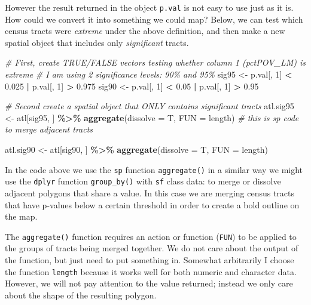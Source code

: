 \documentclass[
]{book}
\newenvironment{Shaded}{\begin{snugshade}}{\end{snugshade}}
\newcommand{\AttributeTok}[1]{\textcolor[rgb]{0.13,0.29,0.53}{#1}}
\newcommand{\CommentTok}[1]{\textcolor[rgb]{0.56,0.35,0.01}{\textit{#1}}}
\newcommand{\DecValTok}[1]{\textcolor[rgb]{0.00,0.00,0.81}{#1}}
\newcommand{\FloatTok}[1]{\textcolor[rgb]{0.00,0.00,0.81}{#1}}
\newcommand{\FunctionTok}[1]{\textcolor[rgb]{0.13,0.29,0.53}{\textbf{#1}}}
\newcommand{\NormalTok}[1]{#1}
\newcommand{\OtherTok}[1]{\textcolor[rgb]{0.56,0.35,0.01}{#1}}
\newcommand{\SpecialCharTok}[1]{\textcolor[rgb]{0.81,0.36,0.00}{\textbf{#1}}}
\newenvironment{rmdtip}[1]
  {
  \begin{itemize}
  \renewcommand{\labelitemi}{
    \raisebox{-.7\height}[0pt][0pt]{
      {\setkeys{Gin}{width=3em,keepaspectratio}\texttt{[image: images/\#1]}}
    }
  }
  \setlength{\fboxsep}{1em}
  \begin{tip}
  \item
  }
  {
  \end{tip}
  \end{itemize}
  }
\begin{document}
However the result returned in the object \texttt{p.val} is not easy to use just as it is. How could we convert it into something we could map? Below, we can test which census tracts were \emph{extreme} under the above definition, and then make a new spatial object that includes only \emph{significant} tracts.

\begin{Shaded}
\begin{Highlighting}[]
\CommentTok{\# First, create TRUE/FALSE vectors testing whether column 1 (pctPOV\_LM) is extreme}
\CommentTok{\# I am using 2 significance levels: 90\% and 95\%}
\NormalTok{sig95 }\OtherTok{\textless{}{-}}\NormalTok{ p.val[, }\DecValTok{1}\NormalTok{] }\SpecialCharTok{\textless{}} \FloatTok{0.025} \SpecialCharTok{|}\NormalTok{ p.val[, }\DecValTok{1}\NormalTok{] }\SpecialCharTok{\textgreater{}} \FloatTok{0.975}
\NormalTok{sig90 }\OtherTok{\textless{}{-}}\NormalTok{ p.val[, }\DecValTok{1}\NormalTok{] }\SpecialCharTok{\textless{}} \FloatTok{0.05} \SpecialCharTok{|}\NormalTok{ p.val[, }\DecValTok{1}\NormalTok{] }\SpecialCharTok{\textgreater{}} \FloatTok{0.95}

\CommentTok{\# Second create a spatial object that ONLY contains significant tracts}
\NormalTok{atl.sig95 }\OtherTok{\textless{}{-}}\NormalTok{ atl[sig95, ] }\SpecialCharTok{\%\textgreater{}\%} 
  \FunctionTok{aggregate}\NormalTok{(}\AttributeTok{dissolve =}\NormalTok{ T, }\AttributeTok{FUN =}\NormalTok{ length) }\CommentTok{\# this is sp code to merge adjacent tracts}

\NormalTok{atl.sig90 }\OtherTok{\textless{}{-}}\NormalTok{ atl[sig90, ] }\SpecialCharTok{\%\textgreater{}\%}
  \FunctionTok{aggregate}\NormalTok{(}\AttributeTok{dissolve =}\NormalTok{ T, }\AttributeTok{FUN =}\NormalTok{ length)}
\end{Highlighting}
\end{Shaded}

\begin{rmdtip}{tip}
In the code above we use the \texttt{sp} function \texttt{aggregate()} in a similar way we might use the \texttt{dplyr} function \texttt{group\_by()} with \texttt{sf} class data: to merge or dissolve adjacent polygons that share a value. In this case we are merging census tracts that have p-values below a certain threshold in order to create a bold outline on the map.

The \texttt{aggregate()} function requires an action or function (\texttt{FUN}) to be applied to the groups of tracts being merged together. We do not care about the output of the function, but just need to put something in. Somewhat arbitrarily I choose the function \texttt{length} because it works well for both numeric and character data. However, we will not pay attention to the value returned; instead we only care about the shape of the resulting polygon.

\end{rmdtip}
\end{document}
